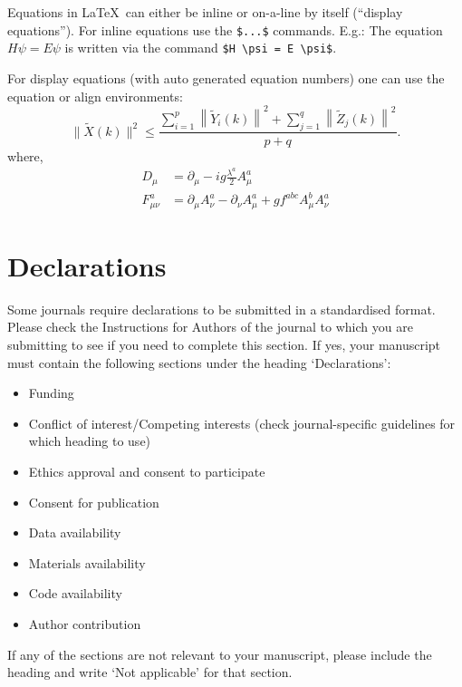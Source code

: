 \documentclass[sn-mathphys-num]{sn-jnl}%
\theoremstyle{thmstyleone}%
\theoremstyle{thmstyletwo}%
\theoremstyle{thmstylethree}%
\begin{document}
\begin{filecontents*}{}
Equations in \LaTeX\ can either be inline or on-a-line by itself (``display equations''). For
inline equations use the \verb+$...$+ commands. E.g.: The equation
$H\psi = E \psi$ is written via the command \verb+$H \psi = E \psi$+.

For display equations (with auto generated equation numbers)
one can use the equation or align environments:
\begin{equation}
    \|\tilde{X}(k)\|^2 \leq\frac{\sum\limits_{i=1}^{p}\left\|\tilde{Y}_i(k)\right\|^2+\sum\limits_{j=1}^{q}\left\|\tilde{Z}_j(k)\right\|^2 }{p+q}.\label{eq1}
\end{equation}
where,
\begin{align}
    D_\mu        & =  \partial_\mu - ig \frac{\lambda^a}{2} A^a_\mu \nonumber                            \\
    F^a_{\mu\nu} & = \partial_\mu A^a_\nu - \partial_\nu A^a_\mu + g f^{abc} A^b_\mu A^a_\nu \label{eq2}
\end{align}

\section*{Declarations}

Some journals require declarations to be submitted in a standardised format. Please check the Instructions for Authors of the journal to which you are submitting to see if you need to complete this section. If yes, your manuscript must contain the following sections under the heading `Declarations':

\begin{itemize}
    \item Funding
    \item Conflict of interest/Competing interests (check journal-specific guidelines for which heading to use)
    \item Ethics approval and consent to participate
    \item Consent for publication
    \item Data availability
    \item Materials availability
    \item Code availability
    \item Author contribution
\end{itemize}

\noindent
If any of the sections are not relevant to your manuscript, please include the heading and write `Not applicable' for that section.


\end{filecontents*}
\end{document}
